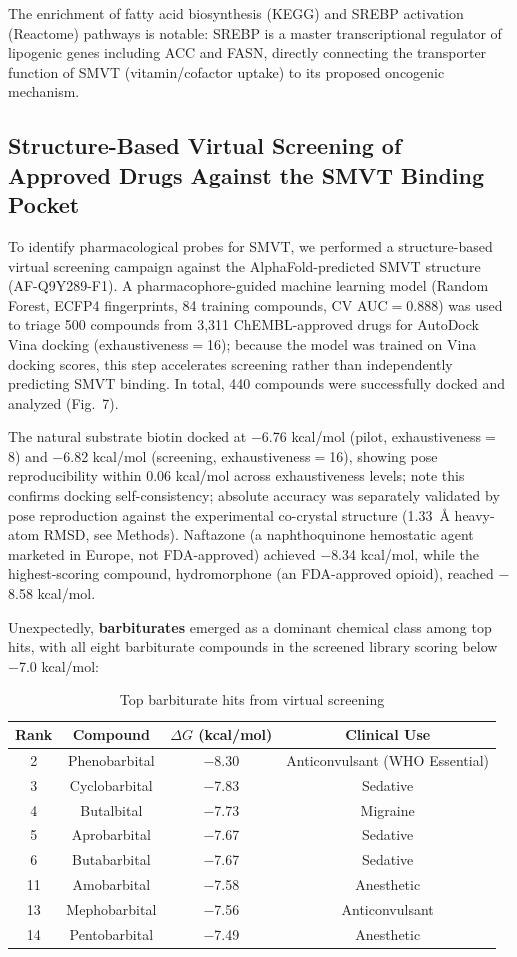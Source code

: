 \documentclass[10pt,letterpaper]{article}
\begin{document}
The enrichment of fatty acid biosynthesis (KEGG) and SREBP activation (Reactome) pathways is notable: SREBP is a master transcriptional regulator of lipogenic genes including ACC and FASN, directly connecting the transporter function of SMVT (vitamin/cofactor uptake) to its proposed oncogenic mechanism.

\subsection*{Structure-Based Virtual Screening of Approved Drugs Against the SMVT Binding Pocket}

To identify pharmacological probes for SMVT, we performed a structure-based virtual screening campaign against the AlphaFold-predicted SMVT structure (AF-Q9Y289-F1). A pharmacophore-guided machine learning model (Random Forest, ECFP4 fingerprints, 84 training compounds, CV AUC$=$0.888) was used to triage 500 compounds from 3,311 ChEMBL-approved drugs for AutoDock Vina docking (exhaustiveness$=$16); because the model was trained on Vina docking scores, this step accelerates screening rather than independently predicting SMVT binding. In total, 440 compounds were successfully docked and analyzed (Fig.~7).

The natural substrate biotin docked at $-$6.76 kcal/mol (pilot, exhaustiveness$=$8) and $-$6.82 kcal/mol (screening, exhaustiveness$=$16), showing pose reproducibility within 0.06 kcal/mol across exhaustiveness levels; note this confirms docking self-consistency; absolute accuracy was separately validated by pose reproduction against the experimental co-crystal structure (1.33~\AA{} heavy-atom RMSD, see Methods). Naftazone (a naphthoquinone hemostatic agent marketed in Europe, not FDA-approved) achieved $-$8.34 kcal/mol, while the highest-scoring compound, hydromorphone (an FDA-approved opioid), reached $-$8.58 kcal/mol.

Unexpectedly, \textbf{barbiturates} emerged as a dominant chemical class among top hits, with all eight barbiturate compounds in the screened library scoring below $-$7.0 kcal/mol:

\begin{table}[t]
\centering
\caption{Top barbiturate hits from virtual screening}
\label{tab:barbiturates}
\begin{tabular}{cccc}
\toprule
Rank & Compound & $\Delta G$ (kcal/mol) & Clinical Use \\
\midrule
 2 & Phenobarbital & $-$8.30 & Anticonvulsant (WHO Essential) \\
 3 & Cyclobarbital & $-$7.83 & Sedative \\
 4 & Butalbital    & $-$7.73 & Migraine \\
 5 & Aprobarbital  & $-$7.67 & Sedative \\
 6 & Butabarbital  & $-$7.67 & Sedative \\
11 & Amobarbital   & $-$7.58 & Anesthetic \\
13 & Mephobarbital & $-$7.56 & Anticonvulsant \\
14 & Pentobarbital & $-$7.49 & Anesthetic \\
\bottomrule
\end{tabular}
\end{table}
\end{document}
